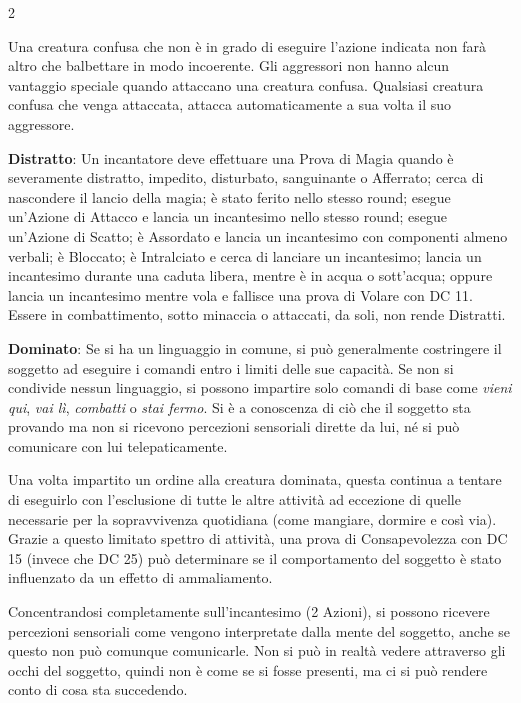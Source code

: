 \begin{multicols}{2}
\medskip

Una creatura confusa che non è in grado di eseguire l'azione indicata non farà altro che balbettare in modo incoerente. Gli aggressori non hanno alcun vantaggio speciale quando attaccano una creatura confusa. Qualsiasi creatura confusa che venga attaccata, attacca automaticamente a sua volta il suo aggressore.

\textbf{Distratto}\hypertarget{defdistratto}{}\label{defdistratto}: Un incantatore deve effettuare una Prova di Magia quando è severamente distratto, impedito, disturbato, sanguinante o Afferrato; cerca di nascondere il lancio della magia; è stato ferito nello stesso round; esegue un'Azione di Attacco e lancia un incantesimo nello stesso round; esegue un'Azione di Scatto; è Assordato e lancia un incantesimo con componenti almeno verbali; è Bloccato; è Intralciato e cerca di lanciare un incantesimo; lancia un incantesimo durante una caduta libera, mentre è in acqua o sott'acqua; oppure lancia un incantesimo mentre vola e fallisce una prova di Volare con DC 11. Essere in combattimento, sotto minaccia o attaccati, da soli, non rende Distratti.

\textbf{Dominato}: Se si ha un linguaggio in comune, si può generalmente costringere il soggetto ad eseguire i comandi entro i limiti delle sue capacità. Se non si condivide nessun linguaggio, si possono impartire solo comandi di base come \emph{vieni qui}, \emph{vai lì}, \emph{combatti} o \emph{stai fermo}. Si è a conoscenza di ciò che il soggetto sta provando ma non si ricevono percezioni sensoriali dirette da lui, né si può comunicare con lui telepaticamente.

Una volta impartito un ordine alla creatura dominata, questa continua a tentare di eseguirlo con l'esclusione di tutte le altre attività ad eccezione di quelle necessarie per la sopravvivenza quotidiana (come mangiare, dormire e così via). Grazie a questo limitato spettro di attività, una prova di Consapevolezza con DC 15 (invece che DC 25) può determinare se il comportamento del soggetto è stato influenzato da un effetto di ammaliamento.

Concentrandosi completamente sull'incantesimo (2 Azioni), si possono ricevere percezioni sensoriali come vengono interpretate dalla mente del soggetto, anche se questo non può comunque comunicarle. Non si può in realtà vedere attraverso gli occhi del soggetto, quindi non è come se si fosse presenti, ma ci si può rendere conto di cosa sta succedendo.


\end{multicols}
